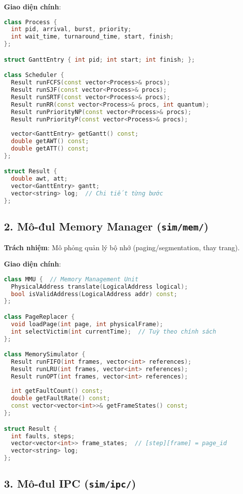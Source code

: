\textbf{Giao diện chính}:
\begin{lstlisting}[language=C++,caption={CPU Scheduler API}]
class Process {
  int pid, arrival, burst, priority;
  int wait_time, turnaround_time, start, finish;
};

struct GanttEntry { int pid; int start; int finish; };

class Scheduler {
  Result runFCFS(const vector<Process>& procs);
  Result runSJF(const vector<Process>& procs);
  Result runSRTF(const vector<Process>& procs);
  Result runRR(const vector<Process>& procs, int quantum);
  Result runPriorityNP(const vector<Process>& procs);
  Result runPriorityP(const vector<Process>& procs);
  
  vector<GanttEntry> getGantt() const;
  double getAWT() const;
  double getATT() const;
};

struct Result {
  double awt, att;
  vector<GanttEntry> gantt;
  vector<string> log;  // Chi tiết từng bước
};
\end{lstlisting}

\subsection{2. Mô-đul Memory Manager (\texttt{sim/mem/})}

\textbf{Trách nhiệm}: Mô phỏng quản lý bộ nhớ (paging/segmentation, thay trang).

\textbf{Giao diện chính}:
\begin{lstlisting}[language=C++,caption={Memory Manager API}]
class MMU {  // Memory Management Unit
  PhysicalAddress translate(LogicalAddress logical);
  bool isValidAddress(LogicalAddress addr) const;
};

class PageReplacer {
  void loadPage(int page, int physicalFrame);
  int selectVictim(int currentTime);  // Tuỳ theo chính sách
};

class MemorySimulator {
  Result runFIFO(int frames, vector<int> references);
  Result runLRU(int frames, vector<int> references);
  Result runOPT(int frames, vector<int> references);
  
  int getFaultCount() const;
  double getFaultRate() const;
  const vector<vector<int>>& getFrameStates() const;
};

struct Result {
  int faults, steps;
  vector<vector<int>> frame_states;  // [step][frame] = page_id
  vector<string> log;
};
\end{lstlisting}

\subsection{3. Mô-đul IPC (\texttt{sim/ipc/})}

